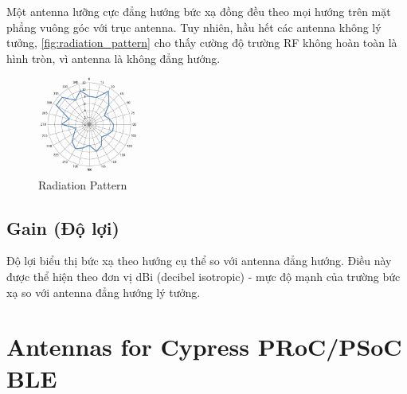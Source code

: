             Một antenna lưỡng cực đẳng hướng bức xạ đồng đều theo mọi hướng
            trên mặt phẳng vuông góc với trục antenna. Tuy nhiên, hầu hết các antenna
            không lý tưởng, \autoref{fig:radiation_pattern} cho thấy cường độ trường RF
            không hoàn toàn là hình tròn, vì antenna là không đẳng hướng.\par
            \begin{figure}[h]
                \centering
                \includegraphics[width=0.3\textwidth]{figures/radiation_pattern.png}
                \caption{Radiation Pattern}
                \label{fig:radiation_pattern}
            \end{figure}

        \subsection{Gain (Độ lợi)}
            Độ lợi biểu thị bức xạ theo hướng cụ thể so với antenna đẳng hướng.
            Điều này được thể hiện theo đơn vị dBi (decibel isotropic) - mực độ mạnh
            của trường bức xạ so với antenna đẳng hướng lý tưởng.\par

    \section{Antennas for Cypress PRoC/PSoC BLE}